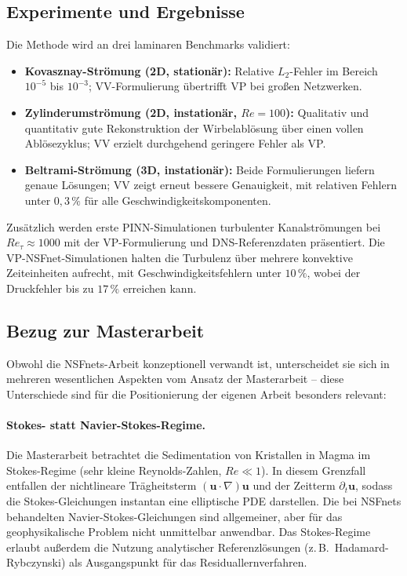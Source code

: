 \documentclass[a4paper,12pt]{article}
\begin{document}
\subsection*{Experimente und Ergebnisse}

Die Methode wird an drei laminaren Benchmarks validiert:
\begin{itemize}
    \item \textbf{Kovasznay-Strömung (2D, stationär):} Relative $L_2$-Fehler
        im Bereich $10^{-5}$ bis $10^{-3}$; VV-Formulierung übertrifft VP
        bei großen Netzwerken.
    \item \textbf{Zylinderumströmung (2D, instationär, $Re = 100$):}
        Qualitativ und quantitativ gute Rekonstruktion der Wirbelablösung
        über einen vollen Ablösezyklus; VV erzielt durchgehend geringere
        Fehler als VP.
    \item \textbf{Beltrami-Strömung (3D, instationär):} Beide Formulierungen
        liefern genaue Lösungen; VV zeigt erneut bessere Genauigkeit, mit
        relativen Fehlern unter $0{,}3\,\%$ für alle Geschwindigkeitskomponenten.
\end{itemize}

Zusätzlich werden erste PINN-Simulationen turbulenter Kanalströmungen
bei $Re_\tau \approx 1000$ mit der VP-Formulierung und DNS-Referenzdaten
präsentiert. Die VP-NSFnet-Simulationen halten die Turbulenz über mehrere
konvektive Zeiteinheiten aufrecht, mit Geschwindigkeitsfehlern unter $10\,\%$,
wobei der Druckfehler bis zu $17\,\%$ erreichen kann.

\subsection*{Bezug zur Masterarbeit}

Obwohl die NSFnets-Arbeit konzeptionell verwandt ist, unterscheidet sie sich in
mehreren wesentlichen Aspekten vom Ansatz der Masterarbeit -- diese Unterschiede
sind für die Positionierung der eigenen Arbeit besonders relevant:

\paragraph{Stokes- statt Navier-Stokes-Regime.}
Die Masterarbeit betrachtet die Sedimentation von Kristallen in Magma im
Stokes-Regime (sehr kleine Reynolds-Zahlen, $Re \ll 1$). In diesem Grenzfall
entfallen der nichtlineare Trägheitsterm $(\mathbf{u} \cdot \nabla)\mathbf{u}$
und der Zeitterm $\partial_t \mathbf{u}$, sodass die Stokes-Gleichungen
instantan eine elliptische PDE darstellen. Die bei NSFnets behandelten
Navier-Stokes-Gleichungen sind allgemeiner, aber für das geophysikalische
Problem nicht unmittelbar anwendbar. Das Stokes-Regime erlaubt außerdem die
Nutzung analytischer Referenzlösungen (z.\,B.\ Hadamard-Rybczynski) als
Ausgangspunkt für das Residuallernverfahren.
\end{document}

